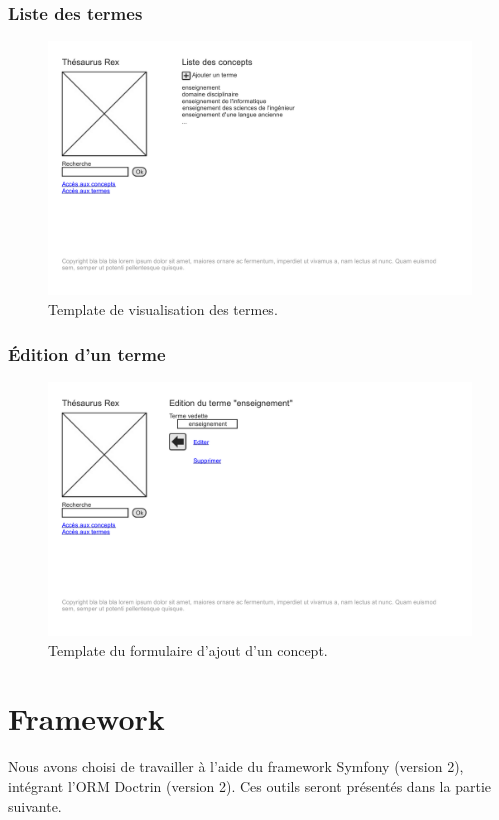 \subsubsection{Liste des termes}
\begin{figure}[H]
\begin{center}
\includegraphics[width=\textwidth]{files/template_termes}
\end{center}
\caption{Template de visualisation des termes.}
\end{figure}

\subsubsection{Édition d'un terme}
\begin{figure}[H]
\begin{center}
\includegraphics[width=\textwidth]{files/template_terme_edit}
\end{center}
\caption{Template du formulaire d'ajout d'un concept.}
\end{figure}


\section{Framework}

Nous avons choisi de travailler à l'aide du framework Symfony (version 2), intégrant l'ORM Doctrin (version 2). Ces outils seront présentés dans la partie suivante.